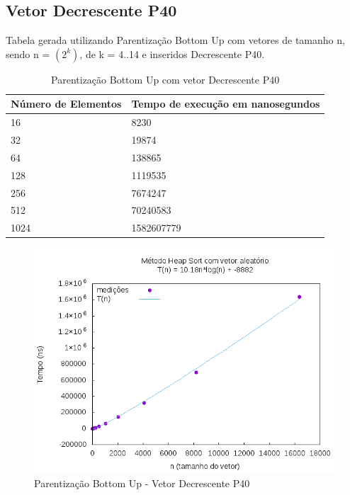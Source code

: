 \documentclass[12pt,a4paper,twoside]{report}
\begin{document}
\subsection{Vetor Decrescente P40}
Tabela gerada utilizando Parentização Bottom Up com vetores de tamanho n, sendo n = $(2^k)$, de k = 4..14 e inseridos Decrescente P40.
\begin{table}[H]
\centering
\caption{Parentização Bottom Up com vetor Decrescente P40}
\label{my-label}
\begin{tabular}{|l|l|}
\hline
\multicolumn{1}{|c|}{\textbf{Número de Elementos}} & \multicolumn{1}{c|}{\textbf{Tempo de execução em nanosegundos}} \\ \hline
16 & 8230 \\ \hline
32 & 19874 \\ \hline
64 & 138865 \\ \hline
128 & 1119535 \\ \hline
256 & 7674247 \\ \hline
512 & 70240583 \\ \hline
1024 & 1582607779 \\ \hline
\end{tabular}
\end{table}

\begin{figure}[H]
    \centering
    \includegraphics[width=0.7\linewidth]{graficos/HeapSort/vIntAleatorio/vIntAleatorio.png}
  \caption{Parentização Bottom Up - Vetor Decrescente P40}
\end{figure}
\end{document}
